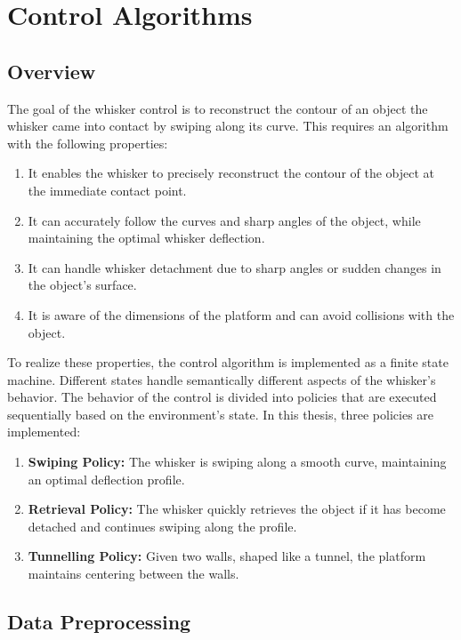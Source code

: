 

\chapter{Control Algorithms}


\section{Overview}

The goal of the whisker control is to reconstruct the contour of an object the whisker came into contact by swiping along its curve.
This requires an algorithm with the following properties:
\begin{enumerate}
    \item It enables the whisker to precisely reconstruct the contour of the object at the immediate contact point.
    \item It can accurately follow the curves and sharp angles of the object, while maintaining the optimal whisker deflection.
    \item It can handle whisker detachment due to sharp angles or sudden changes in the object's surface.
    \item It is aware of the dimensions of the platform and can avoid collisions with the object.
\end{enumerate}

To realize these properties, the control algorithm is implemented as a finite state machine.
Different states handle semantically different aspects of the whisker's behavior.
The behavior of the control is divided into policies that are executed sequentially based on the environment's state.
In this thesis, three policies are implemented:
\begin{enumerate}
    \item \textbf{Swiping Policy:} The whisker is swiping along a smooth curve, maintaining an optimal deflection profile.
    \item \textbf{Retrieval Policy:} The whisker quickly retrieves the object if it has become detached and continues swiping along the profile.
    \item \textbf{Tunnelling Policy:} Given two walls, shaped like a tunnel, the platform maintains centering between the walls.
\end{enumerate}


\section{Data Preprocessing}

